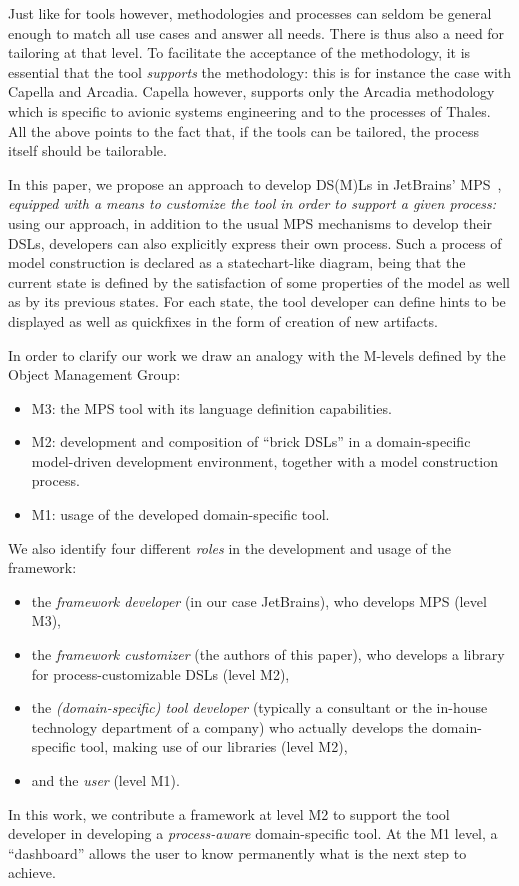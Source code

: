 Just like for tools however, methodologies and processes can seldom be general
enough to match all use cases and answer all needs. There is thus also a need
for tailoring at that level. To facilitate the acceptance of the methodology, it
is essential that the tool \emph{supports} the methodology: this is for instance
the case with Capella and Arcadia.
Capella however, supports only the Arcadia methodology which is specific to
avionic systems engineering and to the processes of Thales.
All the above points to the fact that, if the tools can be tailored, the process
itself should be tailorable.

In this paper, we propose an approach to develop DS(M)Ls in JetBrains'
MPS~\cite{DBLP:conf/pppj/PechSV13}, \emph{equipped with a means to customize the tool in order to support a
given process:} using our approach, in addition to the usual MPS mechanisms to
develop their DSLs, developers can also explicitly express their own process.
Such a process of model construction is declared as a
statechart-like diagram, being that the current state is defined by the
satisfaction of some properties of the model as well as by its previous states.
For each state, the tool developer can define hints to be displayed as well as
quickfixes in the form of creation of new artifacts.

In order to clarify our work we draw an analogy with the M-levels defined by the Object Management Group:
\vspace{-.1cm}
\begin{itemize}
  \item M3: the MPS tool with its language definition capabilities.
  \item M2: development and composition of ``brick DSLs'' in a
  domain-specific model-driven development environment, together with a
  model construction process.
  \item M1: usage of the developed domain-specific tool.
\end{itemize}
\vspace{-.1cm}
We also identify four different \emph{roles} in the development and
usage of the framework:
\vspace{-.1cm}
\begin{itemize}
  \item the \emph{framework developer} (in our case JetBrains), who develops MPS
  (level M3),
  \item the \emph{framework customizer} (the authors of this paper), who
  develops a library for process-customizable DSLs (level M2),
  \item the \emph{(domain-specific) tool developer} 
    (typically a consultant or the in-house technology department of a company)
    who actually develops the domain-specific tool, making use of our libraries (level M2),
  \item and the \emph{user} (level M1).
\end{itemize}
\vspace{-.1cm}
In this work, we contribute a framework at level M2 to support the tool developer
in developing a \emph{process-aware} domain-specific tool.
At the M1 level, a ``dashboard'' allows the user to know permanently what is the
next step to achieve.

